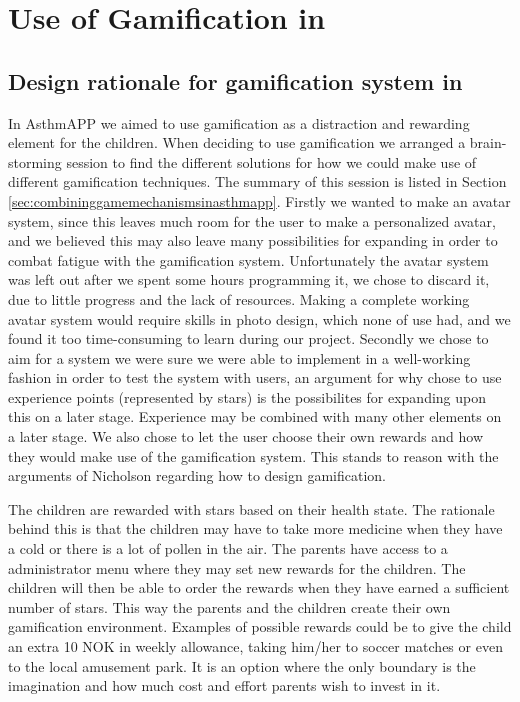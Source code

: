 \section{Use of Gamification in \app{}}
\label{sec:useofgamificationinapp}

\subsection{Design rationale for gamification system in \app{}}
\label{sec:designrationalegamification}
In AsthmAPP we aimed to use gamification as a distraction and rewarding element for the children. When deciding to use gamification we arranged a brain-storming session to find the different solutions for how we could make use of different gamification techniques. The summary of this session is listed in Section \ref{sec:combininggamemechanismsinasthmapp}. Firstly we wanted to make an avatar system, since this leaves much room for the user to make a personalized avatar, and we believed this may also leave many possibilities for expanding in order to combat fatigue with the gamification system. Unfortunately the avatar system was left out after we spent some hours programming it, we chose to discard it, due to little progress and the lack of resources. Making a complete working avatar system would require skills in photo design, which none of use had, and we found it too time-consuming to learn during our project. Secondly we chose to aim for a system we were sure we were able to implement in a well-working fashion in order to test the system with users, an argument for why chose to use experience points (represented by stars) is the possibilites for expanding upon this on a later stage. Experience may be combined with many other elements on a later stage. We also chose to let the user choose their own rewards and how they would make use of the gamification system. This stands to reason with the arguments of Nicholson regarding how to design gamification\cite{nicholson2012user}.

The children are rewarded with stars based on their health state. The rationale behind this is that the children may have to take more medicine when they have a cold or there is a lot of pollen in the air. The parents have access to a administrator menu where they may set new rewards for the children. The children will then be able to order the rewards when they have earned a sufficient number of stars. This way the parents and the children create their own gamification environment. Examples of possible rewards could be to give the child an extra 10 NOK in weekly allowance, taking him/her to soccer matches or even to the local amusement park. It is an option where the only boundary is the imagination and how much cost and effort parents wish to invest in it.    

